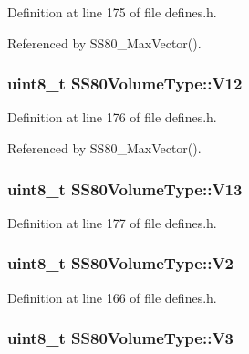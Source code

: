 Definition at line 175 of file defines.\+h.



Referenced by S\+S80\+\_\+\+Max\+Vector().

\subsubsection[{\texorpdfstring{V12}{V12}}]{\setlength{\rightskip}{0pt plus 5cm}uint8\+\_\+t S\+S80\+Volume\+Type\+::\+V12}\hypertarget{structSS80VolumeType_a28e1a9ed69ffd15b93665cc228f292ae}{}\label{structSS80VolumeType_a28e1a9ed69ffd15b93665cc228f292ae}


Definition at line 176 of file defines.\+h.



Referenced by S\+S80\+\_\+\+Max\+Vector().

\subsubsection[{\texorpdfstring{V13}{V13}}]{\setlength{\rightskip}{0pt plus 5cm}uint8\+\_\+t S\+S80\+Volume\+Type\+::\+V13}\hypertarget{structSS80VolumeType_a07df35f7acf6e018789c9fa0e4986665}{}\label{structSS80VolumeType_a07df35f7acf6e018789c9fa0e4986665}


Definition at line 177 of file defines.\+h.

\subsubsection[{\texorpdfstring{V2}{V2}}]{\setlength{\rightskip}{0pt plus 5cm}uint8\+\_\+t S\+S80\+Volume\+Type\+::\+V2}\hypertarget{structSS80VolumeType_ad0c6f3af1c94d925d5e297252a5f22af}{}\label{structSS80VolumeType_ad0c6f3af1c94d925d5e297252a5f22af}


Definition at line 166 of file defines.\+h.

\subsubsection[{\texorpdfstring{V3}{V3}}]{\setlength{\rightskip}{0pt plus 5cm}uint8\+\_\+t S\+S80\+Volume\+Type\+::\+V3}\hypertarget{structSS80VolumeType_a968e3149dd6956c2305fb89b182be16e}{}\label{structSS80VolumeType_a968e3149dd6956c2305fb89b182be16e}


